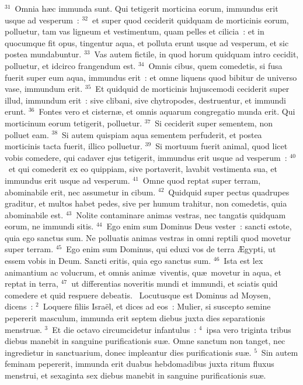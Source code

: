 ${}^{31}$~Omnia h\ae c immunda sunt. Qui tetigerit morticina eorum, immundus erit usque ad vesperum~:
${}^{32}$~et super quod ceciderit quidquam de morticinis eorum, polluetur, tam vas ligneum et vestimentum, quam pelles et cilicia~: et in quocumque fit opus, tingentur aqua, et polluta erunt usque ad vesperum, et sic postea mundabuntur.
${}^{33}$~Vas autem fictile, in quod horum quidquam intro cecidit, polluetur, et idcirco frangendum est.
${}^{34}$~Omnis cibus, quem comedetis, si fusa fuerit super eum aqua, immundus erit~: et omne liquens quod bibitur de universo vase, immundum erit.
${}^{35}$~Et quidquid de morticinis hujuscemodi ceciderit super illud, immundum erit~: sive clibani, sive chytropodes, destruentur, et immundi erunt.
${}^{36}$~Fontes vero et cistern\ae , et omnis aquarum congregatio munda erit. Qui morticinum eorum tetigerit, polluetur.
${}^{37}$~Si ceciderit super sementem, non polluet eam.
${}^{38}$~Si autem quispiam aqua sementem perfuderit, et postea morticinis tacta fuerit, illico polluetur.
${}^{39}$~Si mortuum fuerit animal, quod licet vobis comedere, qui cadaver ejus tetigerit, immundus erit usque ad vesperum~:
${}^{40}$~et qui comederit ex eo quippiam, sive portaverit, lavabit vestimenta sua, et immundus erit usque ad vesperum.
${}^{41}$~Omne quod reptat super terram, abominabile erit, nec assumetur in cibum.
${}^{42}$~Quidquid super pectus quadrupes graditur, et multos habet pedes, sive per humum trahitur, non comedetis, quia abominabile est.
${}^{43}$~Nolite contaminare animas vestras, nec tangatis quidquam eorum, ne immundi sitis.
${}^{44}$~Ego enim sum Dominus Deus vester~: sancti estote, quia ego sanctus sum. Ne polluatis animas vestras in omni reptili quod movetur super terram.
${}^{45}$~Ego enim sum Dominus, qui eduxi vos de terra \AE gypti, ut essem vobis in Deum. Sancti eritis, quia ego sanctus sum.
${}^{46}$~Ista est lex animantium ac volucrum, et omnis anim\ae\ viventis, qu\ae\ movetur in aqua, et reptat in terra,
${}^{47}$~ut differentias noveritis mundi et immundi, et sciatis quid comedere et quid respuere debeatis.
~Locutusque est Dominus ad Moysen, dicens~:
${}^{2}$~Loquere filiis Isra\"el, et dices ad eos~: Mulier, si suscepto semine pepererit masculum, immunda erit septem diebus juxta dies separationis menstru\ae .
${}^{3}$~Et die octavo circumcidetur infantulus~:
${}^{4}$~ipsa vero triginta tribus diebus manebit in sanguine purificationis su\ae . Omne sanctum non tanget, nec ingredietur in sanctuarium, donec impleantur dies purificationis su\ae .
${}^{5}$~Sin autem feminam pepererit, immunda erit duabus hebdomadibus juxta ritum fluxus menstrui, et sexaginta sex diebus manebit in sanguine purificationis su\ae .
